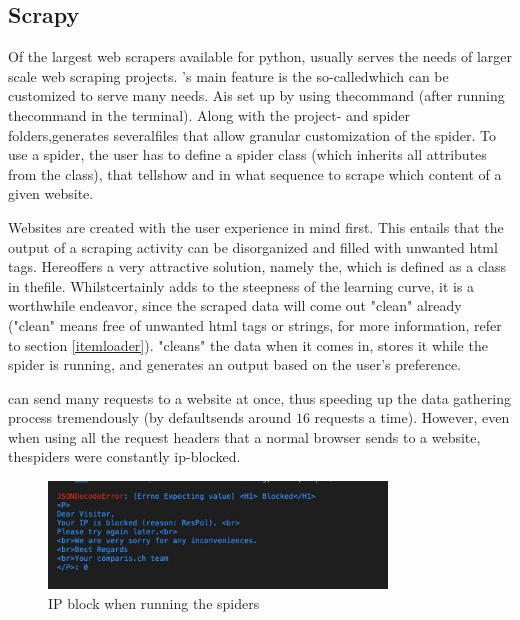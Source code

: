 \documentclass[main]{subfiles}
\begin{document}
\subsection{Scrapy}
Of the largest web scrapers available for python, 
\pkg[Scrapy] usually serves the needs of larger scale web scraping projects.
\pkg[Scrapy]'s main feature is the so-called\pkg[spider]which can be customized to serve many needs.
A\pkg[spider]is set up by using the command 
(after running the command in the terminal).
Along with the project- and spider folders,\pkg[Spider]\hspace{-2pt}generates several\hspace{-1pt}\pkg[.py] 
files that allow granular customization of the spider.
To use a spider, the user has to define a spider class (which inherits all attributes from the class),
that tells\pkg[Scrapy] how and in what sequence to scrape which content of a given website.

Websites are created with the user experience in mind first.
This entails that the output of a scraping activity can be disorganized and filled with unwanted \acs*{html} tags.
Here\pkg[Scrapy] offers a very attractive solution, namely the\pkg[ItemLoader], 
which is defined as a class in the\pkg[items.py] file.
Whilst\pkg[ItemLoader] certainly adds to the steepness of the learning curve, it is a worthwhile endeavor, 
since the scraped data will come out "clean" already ("clean" means free of unwanted \acs*{html} tags or strings, 
for more information, refer to section \ref{itemloader}). 
\pkg[ItemLoader] "cleans" the data when it comes in, stores it while the spider is running, 
and generates an output based on the user's preference.

\pkg[Scrapy] can send many requests to a website at once, 
thus speeding up the data gathering process tremendously (by default\pkg[Scrapy]sends around $16$ requests a time).
However, even when using all the request headers that a normal browser sends to a website, 
the\pkg[Scrapy] spiders were constantly \acs*{ip}-blocked.

\begin{figure}[htbp]
    \centerline{
        \includegraphics[width = 90mm]{prog_2.png}}
    \caption{IP block when running the spiders}
    \label{fig:block}
\end{figure}
\end{document}
